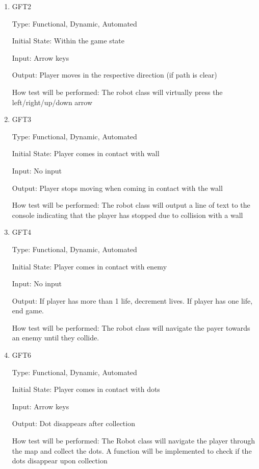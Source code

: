 \documentclass[12pt, titlepage]{article}
\begin{document}
\begin{enumerate}

\item{GFT2\\}

Type: Functional, Dynamic, Automated
					
Initial State: Within the game state
					
Input: Arrow keys
					
Output: Player moves in the respective direction (if path is clear)
					
How test will be performed: The robot class will virtually press the left/right/up/down arrow

\item{GFT3\\}

Type: Functional, Dynamic, Automated
					
Initial State: Player comes in contact with wall
					
Input: No input
					
Output: Player stops moving when coming in contact with the wall

How test will be performed: The robot class will output a line of text to the console indicating that the player has stopped due to collision with a wall

\item{GFT4\\}

Type: Functional, Dynamic, Automated
					
Initial State: Player comes in contact with enemy
					
Input: No input
					
Output: If player has more than 1 life, decrement lives. If player has one life, end game.

How test will be performed: The robot class will navigate the payer towards an enemy until they collide.


\item{GFT6\\}

Type: Functional, Dynamic, Automated
					
Initial State: Player comes in contact with dots
					
Input: Arrow keys
					
Output: Dot disappears after collection

How test will be performed: The Robot class will navigate the player through the map and collect the dots. A function will be implemented to check if the dots disappear upon collection


\end{enumerate}
\end{document}
